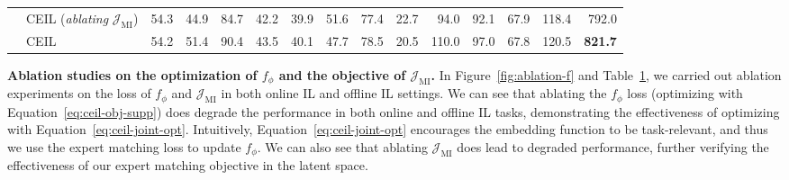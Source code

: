 \begin{table}[H]
{\begin{tabular}{clrrrrrrrrrrrrr}
			& CEIL {(\textit{ablating} $\mathcal{J}_{\text{MI}}$)} 
			&\cellcolor{cyan!19}54.3 	&44.9 	&84.7 	&\cellcolor{cyan!19}42.2 	&\cellcolor{cyan!19}39.9 	&51.6 	&\cellcolor{cyan!19}77.4 	&\cellcolor{cyan!19}22.7 	&94.0 	&92.1 	&\cellcolor{cyan!19}67.9 	&118.4  & 792.0   \\
			& {CEIL } 
			& \cellcolor{cyan!19}54.2  & \cellcolor{cyan!19}51.4  & \cellcolor{cyan!19}90.4  & \cellcolor{cyan!19}43.5  & \cellcolor{cyan!19}40.1  & 47.7  & \cellcolor{cyan!19}78.5  & 20.5  & \cellcolor{cyan!19}110.0  & \cellcolor{cyan!19}97.0  & \cellcolor{cyan!19}67.8  & \cellcolor{cyan!19}120.5  &\cellcolor{cyan!19}\textbf{821.7}\\
			\bottomrule
		\end{tabular}%
	}
	\label{tab:ablation-f-jmi}%
	\vspace{-5pt}
\end{table}%


\textbf{Ablation studies on the optimization of $f_\phi$ and the objective of $\mathcal{J}_{\text{MI}}$.} In Figure~\ref{fig:ablation-f} and Table~\ref{tab:ablation-f-jmi}, we carried out ablation experiments on the loss of $f_\phi$ and $\mathcal{J}_{\text{MI}}$ in both online IL and offline IL settings. 
We can see that ablating the $f_\phi$ loss (optimizing with Equation~\ref{eq:ceil-obj-supp}) does degrade the performance in both online and offline IL tasks, demonstrating the effectiveness of optimizing with Equation~\ref{eq:ceil-joint-opt}. Intuitively, Equation~\ref{eq:ceil-joint-opt} encourages the embedding function to be task-relevant, and thus we use the expert matching loss to update $f_\phi$. 
We can also see that ablating $\mathcal{J}_{\text{MI}}$ does lead to degraded performance, further verifying the effectiveness of our expert matching objective in the latent space. 








